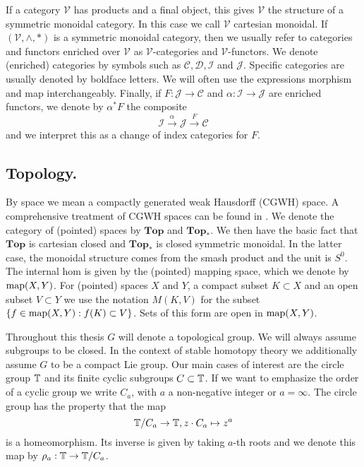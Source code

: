 If a category  $\mathcal{V}$ has products and a final object, this gives
$\mathcal{V}$ the structure of a symmetric monoidal category.
In this case we call $\mathcal{V}$ cartesian monoidal.
If $(\mathcal{V},\wedge, \ast)$ is a symmetric monoidal category,
then we usually refer to categories and functors enriched over $\mathcal{V}$
as $\mathcal{V}$-categories and $\mathcal{V}$-functors. 
We denote (enriched) categories by symbols such as $\mathcal{C}, \mathcal{D}
, \mathcal{I}$ and  $\mathcal{J}$.
Specific categories are usually denoted by boldface letters.
We will often use the expressions morphism
and map interchangeably. Finally, if $F:\mathcal{J}\to \mathcal{C}$
and $\alpha:\mathcal{I}\to \mathcal{J}$
are enriched functors, we denote by $\alpha^\ast F$ the composite
\[
\mathcal{I}\xrightarrow{\alpha} \mathcal{J}\xrightarrow{F} \mathcal{C}
\]
and we interpret this as a change of index categories for $F$.

\subsection*{Topology.}
By space we mean a compactly generated weak Hausdorff (CGWH) space.
A comprehensive treatment of CGWH spaces
can be found in \cite{stricklandcgwh}.
We denote the category of (pointed) spaces by $\mathbf{Top}$ and $\mathbf{Top}_\ast$.
We then have the basic fact that $\mathbf{Top}$ is cartesian closed
and $\mathbf{Top}_\ast$ is closed symmetric monoidal. In the latter case,
the monoidal structure comes from the smash product and the unit is $S^0$.
The internal hom is given by the (pointed) mapping space, which we denote by
$\mathrm{map}(X,Y)$. For (pointed)
spaces $X$ and $Y$, a compact subset $K\subset X$ and an open subset
$V\subset Y$ we use the notation $M(K,V)$ for the subset $\{f\in \mathrm{map}(X,Y):f(K)\subset V\}$.
Sets of this form are open in $\mathrm{map}(X,Y)$.

Throughout this thesis $G$ will denote a topological group. We will always assume
subgroups to be closed. In the context
of stable homotopy theory we additionally assume $G$ to be a compact Lie group.
Our main cases of interest are the circle group $\mathbb{T}$ and its finite cyclic subgroups
$C\subset \mathbb{T}$. If we want to emphasize the order of a cyclic group we write
$C_a$, with $a$ a non-negative integer or $a = \infty$. The circle group
has the property that the map
\[
\mathbb{T}/C_a\to \mathbb{T}, z\cdot C_a\mapsto z^a
\]
is a homeomorphism. Its inverse is given by taking $a$-th roots
and we denote this map by $\rho_a:\mathbb{T}\to \mathbb{T}/C_a$.

